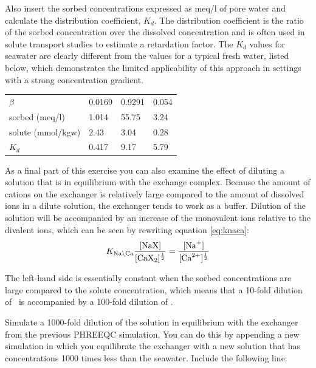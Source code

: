 Also insert the sorbed concentrations expressed as meq/l of pore water and calculate the distribution coefficient, $K_d$. The distribution coefficient is the ratio of the sorbed concentration over the dissolved concentration and is often used in solute transport studies to estimate a retardation factor. The $K_d$ values for seawater are clearly different from the values for a typical fresh water, listed below, which demonstrates the limited applicability of this approach in settings with a strong concentration gradient.

\begin{table}[h]
\centering
\footnotesize
\begin{tabular}{llll}
\toprule
 & \na	& \ca & \mg \\
\midrule
$\beta$           & 0.0169 & 0.9291 & 0.054 \\
sorbed (meq/l)    & 1.014  & 55.75  & 3.24 \\
solute (mmol/kgw) & 2.43   & 3.04   & 0.28 \\
$K_d$             & 0.417  & 9.17   & 5.79 \\
\bottomrule
\end{tabular}
\end{table}

As a final part of this exercise you can also examine the effect of diluting 
a solution that is in equilibrium with the exchange complex. 
Because the amount of cations on the exchanger is relatively 
large compared to the amount of dissolved ions in a dilute solution, 
the exchanger tends to work as a buffer. 
Dilution of the solution will be accompanied by an increase of the 
monovalent ions relative to the divalent ions, which can be seen by rewriting equation \ref{eq:knaca}:
\begin{equation}
K_{\text{Na} \backslash \text{Ca}} \frac{[\text{NaX}]}{[\text{CaX}_{2}]^{\frac{1}{2}}} = \frac{[\text{Na}^{+}]}{[\text{Ca}^{2+}]^{\frac{1}{2}}}
\end{equation}

The left-hand side is essentially constant when the sorbed concentrations 
are large compared to the solute concentration, 
which means that a 10-fold dilution of \na\ is accompanied by a 100-fold dilution of \ca.

Simulate a 1000-fold dilution of the solution in equilibrium with the 
exchanger from the previous PHREEQC simulation. 
You can do this by appending a new simulation in which you equilibrate 
the exchanger with a new solution that has concentrations 1000 times 
less than the seawater. Include the following line:

